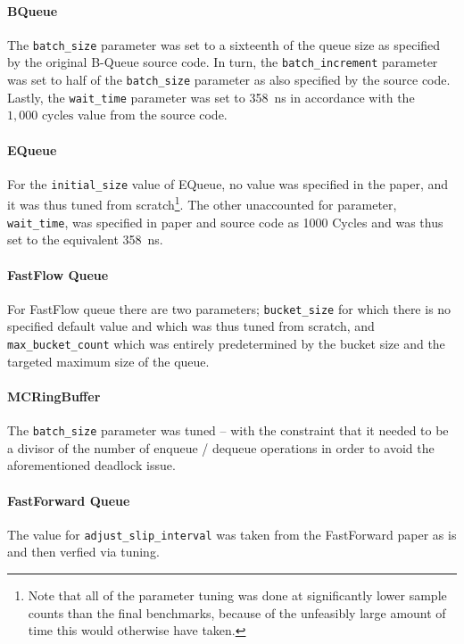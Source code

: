 

\paragraph{BQueue}
The \texttt{batch\_size} parameter was set to a sixteenth of the queue size as specified by the original
B-Queue source code.
In turn, the \texttt{batch\_increment} parameter was set to half of the \texttt{batch\_size} parameter as
also specified by the source code.
Lastly, the \texttt{wait\_time} parameter was set to \SI{358}{\nano\second} in accordance with the
$1,000\text{ cycles}$ value from the source code.

\paragraph{EQueue}
For the \texttt{initial\_size} value of EQueue, no value was specified in the paper, and it was thus tuned
from scratch\footnote{Note that all of the parameter tuning was done at significantly lower sample counts
than the final benchmarks, because of the unfeasibly large amount of time this would otherwise have taken.}.
The other unaccounted for parameter, \texttt{wait\_time}, was specified in paper and source code as 1000
Cycles and was thus set to the equivalent \SI{358}{\nano\second}.

\paragraph{FastFlow Queue}
For FastFlow queue there are two parameters; \texttt{bucket\_size} for which there is no specified default
value and which was thus tuned from scratch, and \texttt{max\_bucket\_count} which was entirely predetermined by
the bucket size and the targeted maximum size of the queue.

\paragraph{MCRingBuffer}
The \texttt{batch\_size} parameter was tuned -- with the constraint that it needed to be a divisor of the
number of enqueue / dequeue operations in order to avoid the aforementioned deadlock issue.

\paragraph{FastForward Queue}
The value for \texttt{adjust\_slip\_interval} was taken from the FastForward paper as is and then verfied via tuning.

